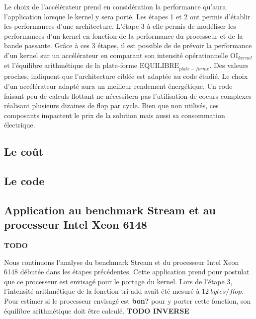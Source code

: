 Le choix de l'accélérateur prend en considération la performance qu'aura l'application lorsque le kernel y sera porté. Les étapes 1 et 2 ont permis d'établir les performances d'une architecture. L'étape 3 à elle permis de modéliser les performances d'un kernel en fonction de la performance du processeur et de la bande passante. Grâce à ces 3 étapes, il est possible de de prévoir la performance d'un kernel sur un accélérateur en comparant son intensité opérationnelle  $\text{OI}_{kernel}$ et l'équilibre arithmétique de la plate-forme $\text{EQUILIBRE}_{plate-forme}$. Des valeurs proches, indiquent que l'architecture ciblée est adaptée au code étudié. Le choix d'un accélérateur adapté aura un meilleur rendement énergétique. Un code faisant peu de calculs flottant ne nécessitera pas l'utilisation de coeurs complexes réalisant plusieurs dizaines de flop par cycle. Bien que non utilisés, ces composants impactent le prix de la solution mais aussi sa consommation électrique.





\subsection{Le coût}





\subsection{Le code}






\subsection{Application au benchmark Stream et au processeur Intel Xeon 6148}
 \textbf{TODO}

Nous continuons l'analyse du benchmark Stream et du processeur Intel Xeon 6148 débutée dans les étapes précédentes. Cette application prend pour postulat que ce processeur est envisagé pour le portage du kernel.
Lors de l'étape 3, l'intensité arithmétique de la fonction tri-add avait été mesuré à $12\ bytes/flop$. Pour estimer si le processeur envisagé est \textbf{bon?} pour y porter cette fonction, son équilibre arithmétique doit être calculé. \textbf{TODO INVERSE}

